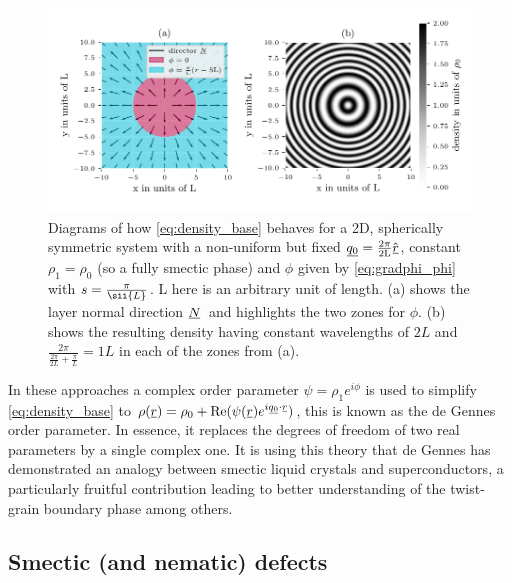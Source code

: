 \documentclass[12pt]{article}
\newcommand{\suf}[2]{\stackunder[0.5pt]{\stackunder[1pt]{\ensuremath{#1}}{\rule{\widthof{\ensuremath{#2}}*\real{0.9}}{.1ex}}}{}}
\newcommand{\su}[1]{\suf{#1}{#1}}
\newcommand{\ssu}[1]{\scriptsize\su{#1}\normalsize}
\newcommand{\NN}{\ensuremath{\su{N}}}
\begin{document}
        \begin{figure}[t]
            \begin{center}
                \includegraphics{figures/misc/wave_phi_example.pdf}
            \end{center}
            \caption{
                Diagrams of how \cref{eq:density_base} behaves for a 2D, spherically symmetric system with a non-uniform but fixed $\su{q_0} = \frac{2\pi}{2\si{L}}\hat{\su{r}}$, constant $\rho_1 = \rho_0$ (so a fully smectic phase) and $\phi$ given by \cref{eq:gradphi_phi} with $s=\frac{\pi}{\sii{L}}$.
                \si{L} here is an arbitrary unit of length.
                (a) shows the layer normal direction \NN\ and highlights the two zones for $\phi$.
                (b) shows the resulting density having constant wavelengths of $2\si{L}$ and $\frac{2\pi}{\frac{2\pi}{2\si{L}}+\frac{\pi}{\si{L}}} = 1\si{L}$ in each of the zones from (a).
            }\label{fig:gradphi}
        \end{figure}

        In these approaches a complex order parameter $\psi=\rho_1e^{i\phi}$ is used to simplify \cref{eq:density_base} to $\rho(\su{r}) = \rho_0 + \Re(\psi(\su{r}) e^{i\ssu{q_0}\cdot\ssu{r}})$, this is known as the de Gennes order parameter.
        In essence, it replaces the degrees of freedom of two real parameters by a single complex one.
        It is using this theory that de Gennes has demonstrated an analogy between smectic liquid crystals and superconductors\cite{degennesAnalogySuperconductorsSmectics1972}, a particularly fruitful contribution leading to better understanding of the twist-grain boundary phase\cite{lubenskyTwistgrainboundaryPhasesNematic1990} among others.

    \subsection{Smectic (and nematic) defects}
\end{document}
